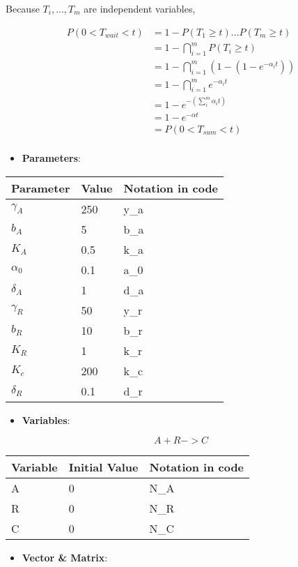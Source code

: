 \documentclass[11pt]{article}
\providecommand{\tightlist}{%
      \setlength{\itemsep}{0pt}\setlength{\parskip}{0pt}}
\begin{document}
Because \(T_i,...,T_m\) are independent variables,

\begin{align}
P(0<T_{wait}<t) &= 1 - P(T_1 \geq t)...P(T_m \geq t) \\
                &= 1 - \bigcap_{i=1}^{m}P(T_{i} \geq t) \\
                &= 1 - \bigcap_{i=1}^{m}(1-(1-e^{-\alpha_{i} t})) \\
                &= 1 - \bigcap_{i=1}^{m}e^{-\alpha_{i} t} \\
                &= 1 - e^{-(\sum_{i}^{m}\alpha_{i}t)} \\
                &= 1 - e^{-\alpha t} \\
                & = P(0<T_{sum}<t) \\
\end{align}

\begin{itemize}
\tightlist
\item
  \textbf{Parameters}:
\end{itemize}

\begin{longtable}[]{@{}lll@{}}
\toprule
Parameter & Value & Notation in code\tabularnewline
\midrule
\endhead
\(\gamma_{A}\) & 250 & y\_a\tabularnewline
\(b_{A}\) & 5 & b\_a\tabularnewline
\(K_A\) & 0.5 & k\_a\tabularnewline
\(\alpha_0\) & 0.1 & a\_0\tabularnewline
\(\delta_{A}\) & 1 & d\_a\tabularnewline
\(\gamma_R\) & 50 & y\_r\tabularnewline
\(b_R\) & 10 & b\_r\tabularnewline
\(K_R\) & 1 & k\_r\tabularnewline
\(K_c\) & 200 & k\_c\tabularnewline
\(\delta_R\) & 0.1 & d\_r\tabularnewline
\bottomrule
\end{longtable}

\begin{itemize}
\tightlist
\item
  \textbf{Variables}:
\end{itemize}

\[A + R -> C\]

\begin{longtable}[]{@{}lll@{}}
\toprule
Variable & Initial Value & Notation in code\tabularnewline
\midrule
\endhead
A & 0 & N\_A\tabularnewline
R & 0 & N\_R\tabularnewline
C & 0 & N\_C\tabularnewline
\bottomrule
\end{longtable}

\begin{itemize}
\tightlist
\item
  \textbf{Vector \& Matrix}:
\end{itemize}
\end{document}
